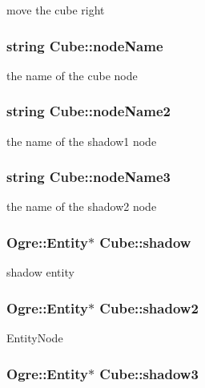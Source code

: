 move the cube right \hypertarget{class_cube_a6f2b818098957d9fbc86b4c419687b40}{
\subsubsection[{node\-Name}]{\setlength{\rightskip}{0pt plus 5cm}string Cube\-::node\-Name}}\label{class_cube_a6f2b818098957d9fbc86b4c419687b40}
the name of the cube node \hypertarget{class_cube_adb599c7527c0a082f07e38e4085a8ded}{
\subsubsection[{node\-Name2}]{\setlength{\rightskip}{0pt plus 5cm}string Cube\-::node\-Name2}}\label{class_cube_adb599c7527c0a082f07e38e4085a8ded}
the name of the shadow1 node \hypertarget{class_cube_aa4e261bd51d36701783bfe90015cfc37}{
\subsubsection[{node\-Name3}]{\setlength{\rightskip}{0pt plus 5cm}string Cube\-::node\-Name3}}\label{class_cube_aa4e261bd51d36701783bfe90015cfc37}
the name of the shadow2 node \hypertarget{class_cube_af31b1b23360a7dd9daec4239cc28b1af}{
\subsubsection[{shadow}]{\setlength{\rightskip}{0pt plus 5cm}Ogre\-::\-Entity$\ast$ Cube\-::shadow}}\label{class_cube_af31b1b23360a7dd9daec4239cc28b1af}
shadow entity \hypertarget{class_cube_af1df68e410cff62cbfb3b6d6d925e0cd}{
\subsubsection[{shadow2}]{\setlength{\rightskip}{0pt plus 5cm}Ogre\-::\-Entity$\ast$ Cube\-::shadow2}}\label{class_cube_af1df68e410cff62cbfb3b6d6d925e0cd}
Entity\-Node \hypertarget{class_cube_a26a6af67ab33f0823ab676f918be4693}{
\subsubsection[{shadow3}]{\setlength{\rightskip}{0pt plus 5cm}Ogre\-::\-Entity$\ast$ Cube\-::shadow3}}\label{class_cube_a26a6af67ab33f0823ab676f918be4693}
